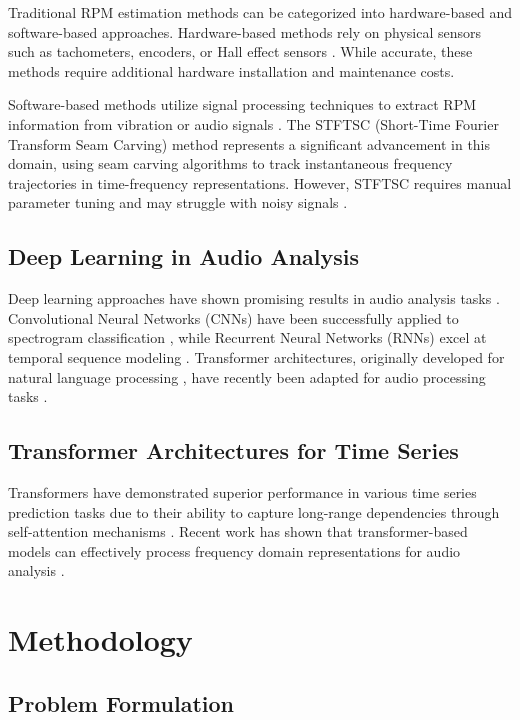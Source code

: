\documentclass[journal,10pt]{IEEEtran}
\begin{document}
Traditional RPM estimation methods can be categorized into hardware-based and software-based approaches. Hardware-based methods rely on physical sensors such as tachometers, encoders, or Hall effect sensors \cite{measurement}. While accurate, these methods require additional hardware installation and maintenance costs.

Software-based methods utilize signal processing techniques to extract RPM information from vibration or audio signals \cite{non3, non1, non4}. The STFTSC (Short-Time Fourier Transform Seam Carving) method \cite{wu2022instantaneous} represents a significant advancement in this domain, using seam carving algorithms to track instantaneous frequency trajectories in time-frequency representations. However, STFTSC requires manual parameter tuning and may struggle with noisy signals \cite{non5}.

\subsection{Deep Learning in Audio Analysis}

Deep learning approaches have shown promising results in audio analysis tasks \cite{biotech}. Convolutional Neural Networks (CNNs) have been successfully applied to spectrogram classification \cite{NN}, while Recurrent Neural Networks (RNNs) excel at temporal sequence modeling \cite{RNN1}. Transformer architectures, originally developed for natural language processing \cite{transformer}, have recently been adapted for audio processing tasks \cite{audio_transformer}.

\subsection{Transformer Architectures for Time Series}

Transformers have demonstrated superior performance in various time series prediction tasks due to their ability to capture long-range dependencies through self-attention mechanisms \cite{transformer}. Recent work has shown that transformer-based models can effectively process frequency domain representations for audio analysis \cite{audio_transformer, GAN1}.

\section{Methodology}

\subsection{Problem Formulation}
\end{document}

